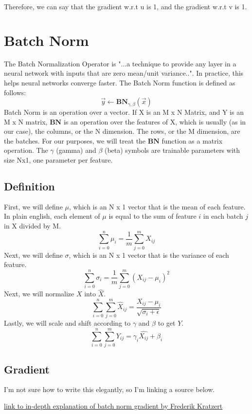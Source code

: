 \documentclass{article}
\begin{document}
        Therefore, we can say that the gradient w.r.t u is 1, and the gradient w.r.t v is 1.

\noindent\makebox[\linewidth]{\rule{\paperwidth}{0.4pt}}
    \section{Batch Norm}
        The Batch Normalization Operator is "...a technique to provide any layer in a neural network with inputs that are zero mean/unit
        variance..".  In practice, this helps neural networks converge faster. The Batch Norm function is defined as follows:
        $$\overrightarrow{y} \leftarrow \boldsymbol{BN}_{\gamma, \beta}(\overrightarrow{x})$$
        Batch Norm is an operation over a vector.  If X is an M x N Matrix, and Y is an M x N matrix, $\boldsymbol{BN}$ is an operation
        over the features of X, which is usually (as in our case), the columns, or the N dimension. The rows, 
        or the M dimension, are the batches. For our purposes, 
        we will treat the $\boldsymbol{BN}$ function as a matrix operation. The $\gamma$ (gamma) and $\beta$ (beta) symbols 
        are trainable parameters with size Nx1, one parameter per feature.
    \subsection{Definition}
        First, we will define $\mu$, which is an N x 1 vector that is the mean of each feature. In plain english, each element of
        $\mu$ is equal to the sum of feature $i$ in each batch $j$ in X divided by M. 
        $$\sum_{i=0}^{n} \mu_i = \frac{1}{m} \sum_{j=0}^{m} X_{ij}$$
        Next, we will define $\sigma$, which is an N x 1 vector that is the variance of each feature.
        $$\sum_{i=0}^{n} \sigma_i = \frac{1}{m} \sum_{j=0}^{m} (X_{ij} - \mu_i)^2$$
        Next, we will normalize $X$ into $\hat{X}$.
        $$\sum_{i=0}^{n} \sum_{j=0}^{m} \hat{X}_{ij} = \frac{X_{ij} - \mu_i}{\sqrt{\sigma_i + \epsilon}}$$
        Lastly, we will scale and shift according to $\gamma$ and $\beta$ to get $Y$. 
        $$\sum_{i=0}^{n} \sum_{j=0}^{m} Y_{ij} = \gamma_i\hat{X_{ij}} + \beta_i$$
    \subsection{Gradient}
        I'm not sure how to write this elegantly, so I'm linking a source below. 

        \href{https://kratzert.github.io/2016/02/12/understanding-the-gradient-flow-through-the-batch-normalization-layer.html}{link
        to in-depth explanation of batch norm gradient by Frederik Kratzert}
\end{document}
